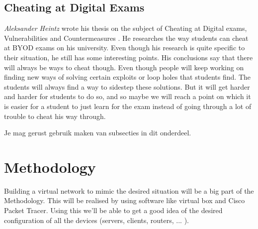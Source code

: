 \documentclass[fleqn,10pt]{voorstel}
\begin{document}
\subsection{Cheating at Digital Exams}
\emph{Aleksander Heintz} wrote his thesis on the subject of Cheating at Digital exams, Vulnerabilities and Countermeasures \autocite {Heintz2017}. He researches the way students can cheat at BYOD exams on his university. Even though his research is quite specific to their situation, he still has some interesting points. His conclusions say that there will always be ways to cheat though. Even though people will keep working on finding new ways of solving certain exploits or loop holes that students find. The students will always find a way to sidestep these solutions. But it will get harder and harder for students to do so, and so maybe we will reach a point on which it is easier for a student to just learn for the exam instead of going through a lot of trouble to cheat his way through.

Je mag gerust gebruik maken van subsecties in dit onderdeel.

\section{Methodology}
\label{sec:methodologie}
Building a virtual network to mimic the desired situation will be a big part of the Methodology. This will be realised by using software like virtual box and Cisco Packet Tracer. Using this we'll be able to get a good idea of the desired configuration of all the devices (servers, clients, routers, ... ).


\end{document}
